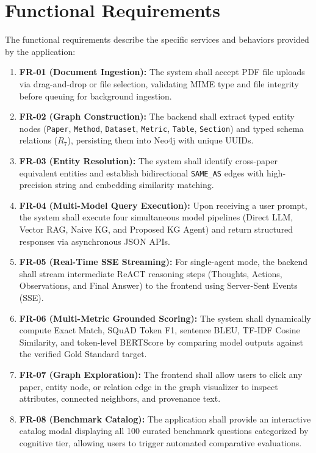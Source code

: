 \section{Functional Requirements}
The functional requirements describe the specific services and behaviors provided by the application:
\begin{enumerate}
    \item \textbf{FR-01 (Document Ingestion):} The system shall accept PDF file uploads via drag-and-drop or file selection, validating MIME type and file integrity before queuing for background ingestion.
    \item \textbf{FR-02 (Graph Construction):} The backend shall extract typed entity nodes (\texttt{Paper}, \texttt{Method}, \texttt{Dataset}, \texttt{Metric}, \texttt{Table}, \texttt{Section}) and typed schema relations ($R_7$), persisting them into Neo4j with unique UUIDs.
    \item \textbf{FR-03 (Entity Resolution):} The system shall identify cross-paper equivalent entities and establish bidirectional \texttt{SAME\_AS} edges with high-precision string and embedding similarity matching.
    \item \textbf{FR-04 (Multi-Model Query Execution):} Upon receiving a user prompt, the system shall execute four simultaneous model pipelines (Direct LLM, Vector RAG, Naive KG, and Proposed KG Agent) and return structured responses via asynchronous JSON APIs.
    \item \textbf{FR-05 (Real-Time SSE Streaming):} For single-agent mode, the backend shall stream intermediate ReACT reasoning steps (Thoughts, Actions, Observations, and Final Answer) to the frontend using Server-Sent Events (SSE).
    \item \textbf{FR-06 (Multi-Metric Grounded Scoring):} The system shall dynamically compute Exact Match, SQuAD Token F1, sentence BLEU, TF-IDF Cosine Similarity, and token-level BERTScore by comparing model outputs against the verified Gold Standard target.
    \item \textbf{FR-07 (Graph Exploration):} The frontend shall allow users to click any paper, entity node, or relation edge in the graph visualizer to inspect attributes, connected neighbors, and provenance text.
    \item \textbf{FR-08 (Benchmark Catalog):} The application shall provide an interactive catalog modal displaying all 100 curated benchmark questions categorized by cognitive tier, allowing users to trigger automated comparative evaluations.
\end{enumerate}

